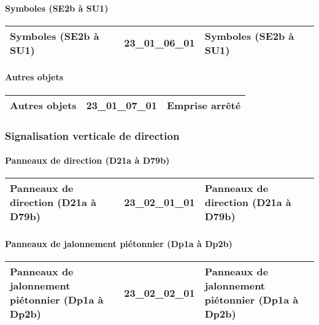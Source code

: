 \documentclass[12pt,titlepage,oneside]{book}
\begin{document}
\paragraph{Symboles (SE2b à SU1)}
\noindent
\vspace{\baselineskip}

\renewcommand{\arraystretch}{1.2}
\begin{supertabular}{|p{10cm}|c|p{15cm}|}
 Symboles (SE2b à SU1) & 23\_01\_06\_01 & Symboles (SE2b à SU1)\\
\hline
\end{supertabular}


\paragraph{Autres objets}
\noindent
\vspace{\baselineskip}

\renewcommand{\arraystretch}{1.2}
\begin{supertabular}{|p{10cm}|c|p{15cm}|}
 Autres objets & 23\_01\_07\_01 & Emprise arrêté\\
\hline
\end{supertabular}

\subsubsection{\large Signalisation verticale de direction}
\paragraph{Panneaux de direction (D21a à D79b)}
\noindent
\vspace{\baselineskip}

\renewcommand{\arraystretch}{1.2}
\begin{supertabular}{|p{10cm}|c|p{15cm}|}
 Panneaux de direction (D21a à D79b) & 23\_02\_01\_01 & Panneaux de direction (D21a à D79b)\\
\hline
\end{supertabular}


\paragraph{Panneaux de jalonnement piétonnier (Dp1a à Dp2b)}
\noindent
\vspace{\baselineskip}

\renewcommand{\arraystretch}{1.2}
\begin{supertabular}{|p{10cm}|c|p{15cm}|}
 Panneaux de jalonnement piétonnier (Dp1a à Dp2b) & 23\_02\_02\_01 & Panneaux de jalonnement piétonnier (Dp1a à Dp2b)\\
\hline
\end{supertabular}
\end{document}
